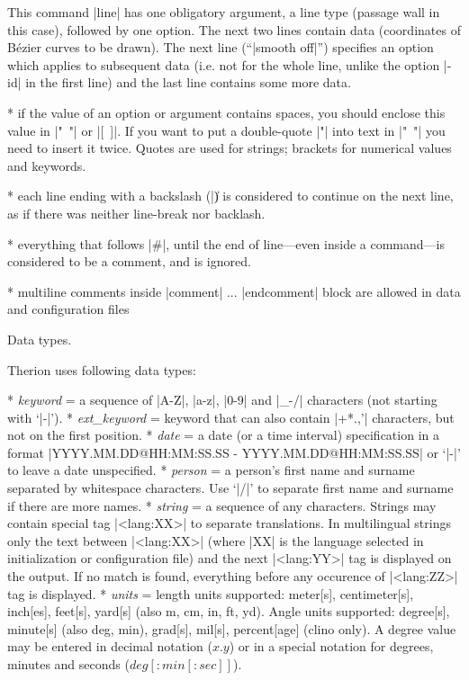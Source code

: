 This command |line| has one obligatory argument, a line type (passage wall in 
this case), followed by one option. The next two lines contain data (coordinates of 
B\'ezier curves to be drawn). The next line (``|smooth off|'') specifies an option which 
applies to subsequent data (i.e. not for the whole line, unlike the option |-id| 
in the first line) and the last line contains some more data.

* if the value of an option or argument contains spaces, you should enclose this
  value in \hbox{|" "|} or \hbox{|[ ]|}. If you want to put a double-quote |"| into 
  text in \hbox{|" "|} you need to insert it twice. Quotes are used for strings; 
  brackets for numerical values and keywords.

* each line ending with a backslash (|\|) is considered to continue on 
  the next line, as if there was neither line-break nor backlash.

* everything that follows |#|, until the end of line---even inside a command---is 
  considered to be a comment, and is ignored.

* multiline comments inside |comment| ... |endcomment| block are allowed in
  data and configuration files

\endlist


\subchapter Data types.

Therion uses following data types:

\list
* {\it keyword} = a sequence of |A-Z|, |a-z|, |0-9| and |_-/| characters 
             (not starting with `|-|').
* {\it ext\_keyword} = keyword that can also contain |+*.,'| characters, 
            but not on the first position.
* {\it date} = a date (or a time interval) specification in a format\hfil\break
          |YYYY.MM.DD@HH:MM:SS.SS - YYYY.MM.DD@HH:MM:SS.SS| or `|-|'
          to leave a date unspecified.
* {\it person} = a person's first name and surname separated by whitespace characters.
            Use `|/|' to separate first name and surname if there are 
            more names.
* {\it string} = a sequence of any characters. 
    Strings may contain special tag |<lang:XX>| to separate 
    translations.
    In multilingual strings only the text between |<lang:XX>|
    (where |XX| is the language selected in initialization 
    or configuration file) and the next |<lang:YY>| 
    tag is displayed on the output. 
    If no match is found, everything before any occurence of
    |<lang:ZZ>| tag is displayed.
* {\it units} = length units supported: 
           meter[s], centimeter[s], inch[es], feet[s], yard[s]
           (also m, cm, in, ft, yd).
           Angle units supported: degree[s], minute[s] (also deg, min), 
	   grad[s], mil[s], percent[age] (clino only). 
           A degree value may be entered in decimal notation
	   ($x.y$) or in a special notation for degrees, minutes and seconds
	   ($deg[{:}min[{:}sec]]$).
\endlist



